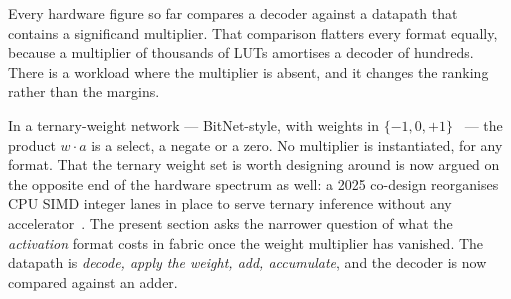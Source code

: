 \documentclass[11pt]{article}
\theoremstyle{definition}
\begin{document}
Every hardware figure so far compares a decoder against a datapath that contains a
significand multiplier. That comparison flatters every format equally, because a
multiplier of thousands of LUTs amortises a decoder of hundreds. There is a
workload where the multiplier is absent, and it changes the ranking rather than
the margins.

In a ternary-weight network --- BitNet-style, with weights in
$\{-1, 0, +1\}$~\cite{bitnet} --- the product $w \cdot a$ is a select, a negate or
a zero. No multiplier is instantiated, for any format. That the ternary weight set
is worth designing around is now argued on the opposite end of the hardware
spectrum as well: a 2025 co-design reorganises CPU SIMD integer lanes in place to
serve ternary inference without any accelerator~\cite{oh2025tsar}. The present
section asks the narrower question of what the \emph{activation} format costs in
fabric once the weight multiplier has vanished. The datapath is
\emph{decode, apply the weight, add, accumulate}, and the decoder is now compared
against an adder.
\end{document}
